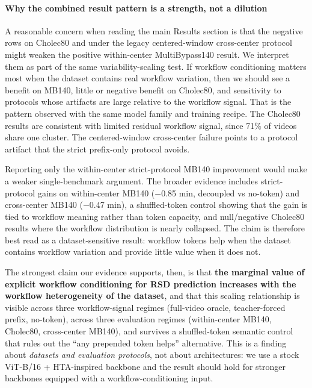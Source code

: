 \paragraph{Why the combined result pattern is a strength, not a
dilution}\label{why-the-combined-result-pattern-is-a-strength-not-a-dilution}

A reasonable concern when reading the main Results section is that the
negative rows on Cholec80 and under the legacy centered-window
cross-center protocol might weaken the positive within-center
MultiBypass140 result. We interpret them as part of the same
variability-scaling test. If workflow conditioning matters most when the
dataset contains real workflow variation, then we should see a benefit
on MB140, little or negative benefit on Cholec80, and sensitivity to
protocols whose artifacts are large relative to the workflow signal.
That is the pattern observed with the same model family and training
recipe. The Cholec80 results are consistent with limited residual
workflow signal, since 71\% of videos share one cluster. The
centered-window cross-center failure points to a protocol artifact that
the strict prefix-only protocol avoids.

Reporting only the within-center strict-protocol MB140 improvement would
make a weaker single-benchmark argument. The broader evidence includes
strict-protocol gains on within-center MB140 ($-$0.85 min, decoupled vs
no-token) and cross-center MB140 ($-$0.47 min), a shuffled-token control
showing that the gain is tied to workflow meaning rather than token
capacity, and null/negative Cholec80 results where the workflow
distribution is nearly collapsed. The claim is therefore best read as a
dataset-sensitive result: workflow tokens help when the dataset contains
workflow variation and provide little value when it does not.

The strongest claim our evidence supports, then, is that \textbf{the
marginal value of explicit workflow conditioning for RSD prediction
increases with the workflow heterogeneity of the dataset}, and that this
scaling relationship is visible across three workflow-signal regimes
(full-video oracle, teacher-forced prefix, no-token), across three
evaluation regimes (within-center MB140, Cholec80, cross-center MB140),
and survives a shuffled-token semantic control that rules out the ``any
prepended token helps'' alternative. This is a finding about
\emph{datasets and evaluation protocols}, not about architectures: we
use a stock ViT-B/16 + HTA-inspired backbone and the result should
hold for stronger backbones equipped with a workflow-conditioning input.

